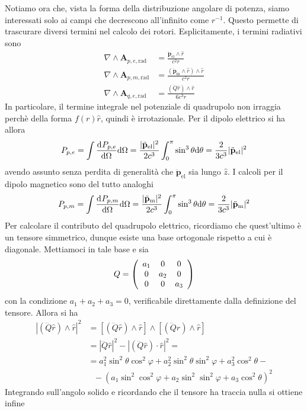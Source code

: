 \documentclass{article}
\renewcommand{\vec}[1]{\mathbf{#1}}
\begin{document}
\begin{enumerate}
	Notiamo ora che, vista la forma della distribuzione angolare di potenza, siamo interessati solo ai campi che decrescono all'infinito come $r^{-1}$. Questo permette di trascurare diversi termini nel calcolo dei rotori. Esplicitamente, i termini radiativi sono
	\begin{align*}
		\nabla\wedge\vec{A}_{p,e,\textrm{rad}}&=\frac{\ddot{\vec{p}}_\textrm{el}\wedge\hat{r}}{c^2r}\\
		\nabla\wedge\vec{A}_{p,m,\textrm{rad}}&=\frac{(\ddot{\vec{p}}_\textrm{m}\wedge\hat{r})\wedge\hat{r}}{c^2r}\\
		\nabla\wedge\vec{A}_{q,e,\textrm{rad}}&=\frac{(\dddot{Q}\hat{r})\wedge\hat{r}}{6c^3r}
	\end{align*}
	In particolare, il termine integrale nel potenziale di quadrupolo non irraggia perchè della forma $f(r)\hat{r}$, quindi è irrotazionale. Per il dipolo elettrico si ha allora
	\[P_{{p,e}}=\int\der{P_{p,e}}{\Omega}\d \Omega=\frac{|\ddot{\vec{p}}_\textrm{el}|^2}{2c^3}\int_0^\pi\sin^3\theta\d\theta=\frac{2}{3c^3}|\ddot{\vec{p}}_\textrm{el}|^2\]
	avendo assunto senza perdita di generalità che $\ddot{\vec{p}}_\textrm{el}$ sia lungo $\hat{z}$. I calcoli per il dipolo magnetico sono del tutto analoghi
	\[P_{p,m}=\int\der{P_{p,m}}{\Omega}\d \Omega=\frac{|\ddot{\vec{p}}_\textrm{m}|^2}{2c^3}\int_0^\pi\sin^3\theta\d\theta=\frac{2}{3c^3}|\ddot{\vec{p}}_\textrm{m}|^2\]
	Per calcolare il contributo del quadrupolo elettrico, ricordiamo che quest'ultimo è un tensore simmetrico, dunque esiste una base ortogonale rispetto a cui è diagonale. Mettiamoci in tale base e sia
	\[Q=\left(\begin{array}{c c c}
	a_1&0&0\\0&a_2&0\\0&0&a_3
	\end{array}\right)\]
	con la condizione $a_1+a_2+a_3=0$, verificabile direttamente dalla definizione del tensore. Allora si ha
	\begin{align*}
		|(\dddot{Q}\hat{r})\wedge\hat{r}|^2&=[(\dddot{Q}\hat{r})\wedge\hat{r}]\wedge[(\dddot{Q}\hat{r})\wedge\hat{r}]\\&=|\dddot{Q}\hat{r}|^2-|(\dddot{Q}\hat{r})\cdot\hat{r}|^2=\\&=a_1^2\sin^2\theta\cos^2\varphi+a_2^2\sin^2\theta\sin^2\varphi+a_3^2\cos^2\theta-\\&\textrm{ }-(a_1\sin^2\cos^2\varphi+a_2\sin^2\sin^2\varphi+a_3\cos^2\theta)^2
	\end{align*}
	Integrando sull'angolo solido e ricordando che il tensore ha traccia nulla si ottiene infine

\end{enumerate}
\end{document}
